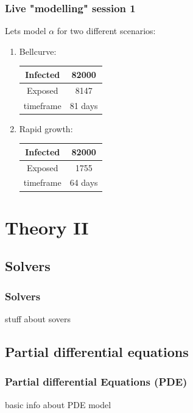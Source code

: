 \documentclass{beamer}
\begin{document}
\begin{frame}
\frametitle{Live "modelling" session 1} 
	Lets model $\alpha$ for  two different scenarios:\\\vspace{0.3cm}
	\begin{enumerate}
		\item Bellcurve:\\\vspace{0.1cm}
			\begin{tabular}{| c | c |}
				\hline
				Infected & 82000 \\
				\hline
				Exposed & 8147 \\
				\hline
				timeframe & 81 days \\
				\hline
			\end{tabular} \vspace{0.5cm}

		\item Rapid growth:\\\vspace{0.1cm}
			\begin{tabular}{| c | c |}
				\hline
				Infected & 82000 \\
				\hline
				Exposed & 1755 \\
				\hline
				timeframe & 64 days \\
				\hline
			\end{tabular}
	\end{enumerate}
\end{frame}

\section{Theory II}

\subsection{Solvers}
\begin{frame}
\frametitle{Solvers} 
	stuff about sovers
\end{frame}

\subsection{Partial differential equations}
\begin{frame}
	\frametitle{Partial differential Equations (PDE)} 
	basic info about PDE model
\end{frame}
\end{document}
